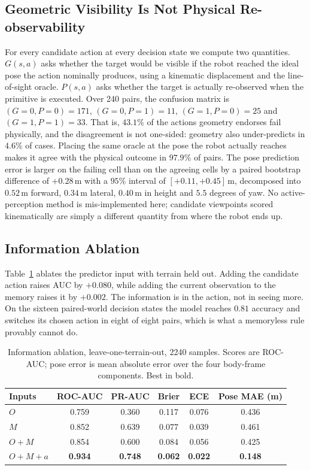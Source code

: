\documentclass[conference]{IEEEtran}
\begin{document}
\subsection{Geometric Visibility Is Not Physical Re-observability}

For every candidate action at every decision state we compute two quantities.
$G(s,a)$ asks whether the target would be visible if the robot reached the ideal pose
the action nominally produces, using a kinematic displacement and the line-of-sight
oracle. $P(s,a)$ asks whether the target is actually re-observed when the primitive is
executed. Over 240 pairs, the confusion matrix is $(G{=}0,P{=}0)=171$,
$(G{=}0,P{=}1)=11$, $(G{=}1,P{=}0)=25$ and $(G{=}1,P{=}1)=33$. That is, $43.1\%$ of
the actions geometry endorses fail physically, and the disagreement is not
one-sided: geometry also under-predicts in $4.6\%$ of cases. Placing the same oracle
at the pose the robot actually reaches makes it agree with the physical outcome in
$97.9\%$ of pairs. The pose prediction error is larger on the failing cell than on the
agreeing cells by a paired bootstrap difference of $+0.28$\,m with a $95\%$ interval
of $[+0.11, +0.45]$\,m, decomposed into $0.52$\,m forward, $0.34$\,m lateral,
$0.40$\,m in height and $5.5$ degrees of yaw. No active-perception method is
mis-implemented here; candidate viewpoints scored kinematically are simply a different
quantity from where the robot ends up.

\subsection{Information Ablation}

Table~\ref{tab:ablation} ablates the predictor input with terrain held out. Adding the
candidate action raises AUC by $+0.080$, while adding the current observation to the
memory raises it by $+0.002$. The information is in the action, not in seeing more. On
the sixteen paired-world decision states the model reaches $0.81$ accuracy and
switches its chosen action in eight of eight pairs, which is what a memoryless rule
provably cannot do.

\begin{table}[t]
\caption{Information ablation, leave-one-terrain-out, 2240 samples. Scores are
ROC-AUC; pose error is mean absolute error over the four body-frame components. Best
in bold.}
\label{tab:ablation}
\centering
\small
\begin{tabular}{@{}lccccc@{}}
\toprule
Inputs & ROC-AUC & PR-AUC & Brier & ECE & Pose MAE (m)\\
\midrule
$O$            & 0.759 & 0.360 & 0.117 & 0.076 & 0.436\\
$M$            & 0.852 & 0.639 & 0.077 & 0.039 & 0.461\\
$O{+}M$        & 0.854 & 0.600 & 0.084 & 0.056 & 0.425\\
$O{+}M{+}a$    & \textbf{0.934} & \textbf{0.748} & \textbf{0.062} &
                 \textbf{0.022} & \textbf{0.148}\\
\bottomrule
\end{tabular}
\end{table}
\end{document}
